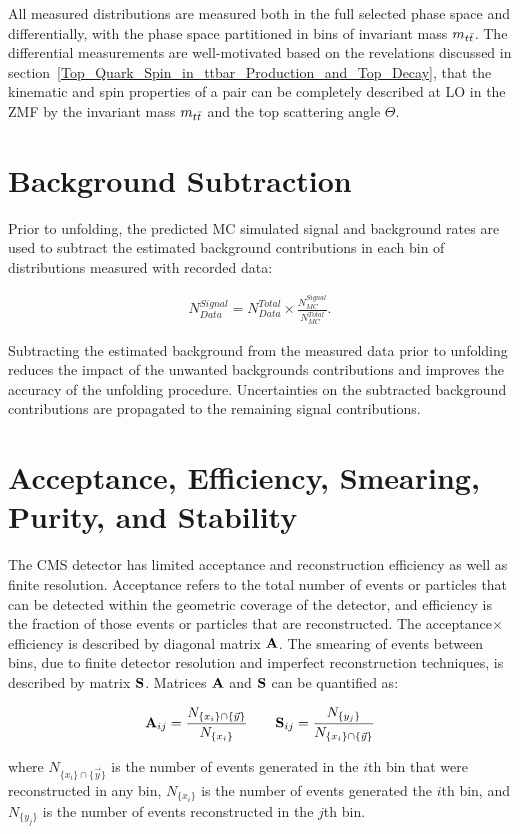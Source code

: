 All measured distributions are measured both in the full selected phase space and differentially, with the phase space partitioned in bins of \ttbar invariant mass $m_{t\bar{t}}$.
The differential measurements are well-motivated based on the revelations discussed in section~\ref{Top_Quark_Spin_in_ttbar_Production_and_Top_Decay}, that the kinematic and spin properties of a \ttbar pair can be completely described at LO in the \ttbar ZMF by the invariant mass $m_{t\bar{t}}$ and the top scattering angle $\Theta$.

\clearpage
\section{Background Subtraction}
\label{Background_Subtraction}
Prior to unfolding, the predicted MC simulated signal and background rates are used to subtract the estimated background contributions in each bin of distributions measured with recorded data:
\begin{linenomath*}
\begin{align}
N^{Signal}_{Data} = N^{Total}_{Data} \times \frac{N^{Signal}_{MC}}{N^{Total}_{MC}}.
\label{Data_Background_Subtraction}
\end{align}
\end{linenomath*}
Subtracting the estimated background from the measured data prior to unfolding reduces the impact of the unwanted backgrounds contributions and improves the accuracy of the unfolding procedure.
Uncertainties on the subtracted background contributions are propagated to the remaining signal contributions.

\section{Acceptance, Efficiency, Smearing, Purity, and Stability}
The CMS detector has limited acceptance and reconstruction efficiency as well as finite resolution.
Acceptance refers to the total number of events or particles that can be detected within the geometric coverage of the detector, and efficiency is the fraction of those events or particles that are reconstructed.
The acceptance$\times$efficiency is described by diagonal matrix $\mathbf{A}$. 
The smearing of events between bins, due to finite detector resolution and imperfect reconstruction techniques, is described by matrix $\mathbf{S}$.
Matrices $\mathbf{A}$ and $\mathbf{S}$ can be quantified as:
\begin{linenomath*}
\begin{align}
\mathbf{A}_{ij} = \frac{N_{ \{ x_i \} \cap \{ \vec{y} \}}}{N_{ \{ x_i \} }} \quad \quad
\mathbf{S}_{ij} = \frac{N_{ \{ y_j \} }}{N_{ \{ x_i \} \cap \{ \vec{y} \}}}
\end{align}
\end{linenomath*}
where $N_{ \{ x_i \} \cap \{ \vec{y} \}}$ is the number of events generated in the $i$th bin that were reconstructed in any bin, $N_{ \{ x_i \} }$ is the number of events generated the $i$th bin, and $N_{ \{ y_j \} }$ is the number of events reconstructed in the $j$th bin.

